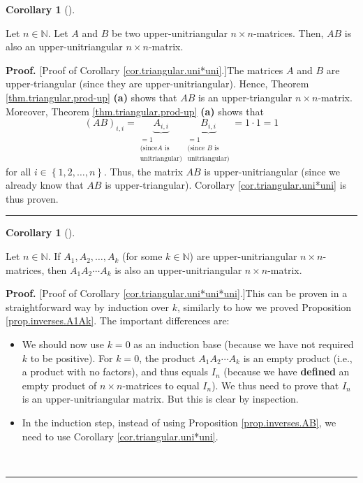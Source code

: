 \documentclass[numbers=enddot,12pt,final,onecolumn,notitlepage]{scrartcl}%
\theoremstyle{definition}
\newtheorem{coro}[theo]{Corollary}
\newenvironment{corollary}[1][]
{\begin{coro}[#1]\begin{leftbar}}
{\end{leftbar}\end{coro}}
\newenvironment{proof}[1][Proof]{\noindent\textbf{#1.} }{\ \rule{0.5em}{0.5em}}
\begin{document}
\begin{corollary}
\label{cor.triangular.uni*uni}Let $n\in\mathbb{N}$. Let $A$ and $B$ be two
upper-unitriangular $n\times n$-matrices. Then, $AB$ is also an
upper-unitriangular $n\times n$-matrix.
\end{corollary}

\begin{proof}
[Proof of Corollary \ref{cor.triangular.uni*uni}.]The matrices $A$ and $B$ are
upper-triangular (since they are upper-unitriangular). Hence, Theorem
\ref{thm.triangular.prod-up} \textbf{(a)} shows that $AB$ is an
upper-triangular $n\times n$-matrix. Moreover, Theorem
\ref{thm.triangular.prod-up} \textbf{(a)} shows that
\[
\left(  AB\right)  _{i,i}=\underbrace{A_{i,i}}_{\substack{=1\\\text{(since
}A\text{ is}\\\text{unitriangular)}}}\underbrace{B_{i,i}}%
_{\substack{=1\\\text{(since }B\text{ is}\\\text{unitriangular)}}}=1\cdot1=1
\]
for all $i\in\left\{  1,2,\ldots,n\right\}  $. Thus, the matrix $AB$ is
upper-unitriangular (since we already know that $AB$ is upper-triangular).
Corollary \ref{cor.triangular.uni*uni} is thus proven.
\end{proof}

\begin{corollary}
\label{cor.triangular.uni*uni*uni}Let $n\in\mathbb{N}$. If $A_{1},A_{2}%
,\ldots,A_{k}$ (for some $k\in\mathbb{N}$) are upper-unitriangular $n\times
n$-matrices, then $A_{1}A_{2}\cdots A_{k}$ is also an upper-unitriangular
$n\times n$-matrix.
\end{corollary}

\begin{proof}
[Proof of Corollary \ref{cor.triangular.uni*uni*uni}.]This can be proven in a
straightforward way by induction over $k$, similarly to how we proved
Proposition \ref{prop.inverses.A1Ak}. The important differences are:

\begin{itemize}
\item We should now use $k=0$ as an induction base (because we have not
required $k$ to be positive). For $k=0$, the product $A_{1}A_{2}\cdots A_{k}$
is an empty product (i.e., a product with no factors), and thus equals $I_{n}$
(because we have \textbf{defined} an empty product of $n\times n$-matrices to
equal $I_{n}$). We thus need to prove that $I_{n}$ is an upper-unitriangular
matrix. But this is clear by inspection.

\item In the induction step, instead of using Proposition
\ref{prop.inverses.AB}, we need to use Corollary \ref{cor.triangular.uni*uni}.
\end{itemize}
\end{proof}
\end{document}
